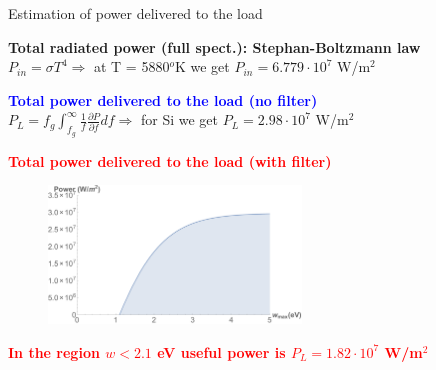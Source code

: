 \documentclass{beamer}
\begin{document}
\begin{frame}{Estimation of power delivered to the load}
\begin{center}
\textbf{Total radiated power (full spect.): Stephan-Boltzmann law}\\
$P_{in} = \sigma T^4 \Rightarrow$ at T = 5880$^o$K we get $P_{in}  = 6.779\cdot10^7$ W/m$^2$
\end{center}

\vspace{0.1cm}

\begin{center}
\textcolor{blue}{\textbf{Total power delivered to the load (no filter)}}\\
$ P_{L} = f_{g}\int_{f_{g}}^{\infty}\frac{1}{f}\frac{\partial P}{\partial f}df \Rightarrow$ for Si we get $P_{L}  = 2.98\cdot10^7$ W/m$^2$
\end{center}

\vspace{0.1cm}

\begin{center}
\textcolor{red}{\textbf{Total power delivered to the load (with filter)}}\\
\end{center}

\begin{figure} [t]
\includegraphics[width=0.6\textwidth]{figures/figure5_solar_cell_optimization_power.pdf}
\end{figure}

\vspace{-0.1cm}
\begin{center}
\textcolor{red}{\textbf{In the region $w < 2.1$ eV useful power is $P_{L} = 1.82\cdot10^7$ W/m$^2$}}
\end{center}

\end{frame}
\end{document}
